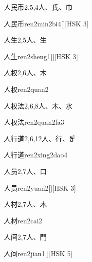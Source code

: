 \begin{entry}{人民币}{2,5,4}{⼈、⽒、⼱}
  \begin{phonetics}{人民币}{ren2min2bi4}[][HSK 3]
  \end{phonetics}
\end{entry}

\begin{entry}{人生}{2,5}{⼈、⽣}
  \begin{phonetics}{人生}{ren2sheng1}[][HSK 3]
  \end{phonetics}
\end{entry}

\begin{entry}{人权}{2,6}{⼈、⽊}
  \begin{phonetics}{人权}{ren2quan2}
  \end{phonetics}
\end{entry}

\begin{entry}{人权法}{2,6,8}{⼈、⽊、⽔}
  \begin{phonetics}{人权法}{ren2quan2fa3}
  \end{phonetics}
\end{entry}

\begin{entry}{人行道}{2,6,12}{⼈、⾏、⾡}
  \begin{phonetics}{人行道}{ren2xing2dao4}
  \end{phonetics}
\end{entry}

\begin{entry}{人员}{2,7}{⼈、⼝}
  \begin{phonetics}{人员}{ren2yuan2}[][HSK 3]
  \end{phonetics}
\end{entry}

\begin{entry}{人材}{2,7}{⼈、⽊}
  \begin{phonetics}{人材}{ren2cai2}
  \end{phonetics}
\end{entry}

\begin{entry}{人间}{2,7}{⼈、⾨}
  \begin{phonetics}{人间}{ren2jian1}[][HSK 5]
  \end{phonetics}
\end{entry}

